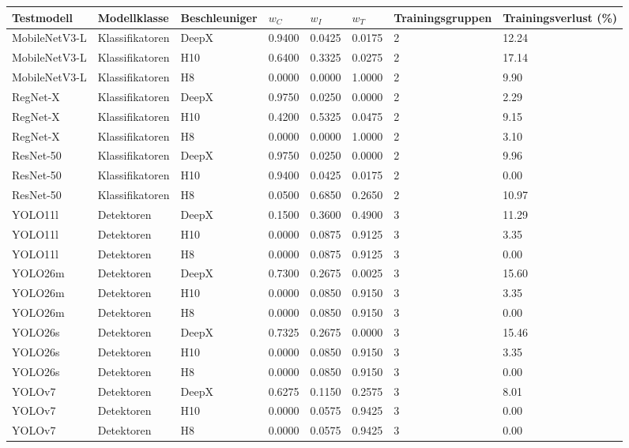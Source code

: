 \begin{tabular}{@{}llllllll@{}}
\toprule
Testmodell & Modellklasse & Beschleuniger & $w_C$ & $w_I$ & $w_T$ & Trainingsgruppen & Trainingsverlust (\%) \\
\midrule
MobileNetV3-L & Klassifikatoren & DeepX & 0.9400 & 0.0425 & 0.0175 & 2 & 12.24 \\
MobileNetV3-L & Klassifikatoren & H10 & 0.6400 & 0.3325 & 0.0275 & 2 & 17.14 \\
MobileNetV3-L & Klassifikatoren & H8 & 0.0000 & 0.0000 & 1.0000 & 2 & 9.90 \\
RegNet-X & Klassifikatoren & DeepX & 0.9750 & 0.0250 & 0.0000 & 2 & 2.29 \\
RegNet-X & Klassifikatoren & H10 & 0.4200 & 0.5325 & 0.0475 & 2 & 9.15 \\
RegNet-X & Klassifikatoren & H8 & 0.0000 & 0.0000 & 1.0000 & 2 & 3.10 \\
ResNet-50 & Klassifikatoren & DeepX & 0.9750 & 0.0250 & 0.0000 & 2 & 9.96 \\
ResNet-50 & Klassifikatoren & H10 & 0.9400 & 0.0425 & 0.0175 & 2 & 0.00 \\
ResNet-50 & Klassifikatoren & H8 & 0.0500 & 0.6850 & 0.2650 & 2 & 10.97 \\
YOLO11l & Detektoren & DeepX & 0.1500 & 0.3600 & 0.4900 & 3 & 11.29 \\
YOLO11l & Detektoren & H10 & 0.0000 & 0.0875 & 0.9125 & 3 & 3.35 \\
YOLO11l & Detektoren & H8 & 0.0000 & 0.0875 & 0.9125 & 3 & 0.00 \\
YOLO26m & Detektoren & DeepX & 0.7300 & 0.2675 & 0.0025 & 3 & 15.60 \\
YOLO26m & Detektoren & H10 & 0.0000 & 0.0850 & 0.9150 & 3 & 3.35 \\
YOLO26m & Detektoren & H8 & 0.0000 & 0.0850 & 0.9150 & 3 & 0.00 \\
YOLO26s & Detektoren & DeepX & 0.7325 & 0.2675 & 0.0000 & 3 & 15.46 \\
YOLO26s & Detektoren & H10 & 0.0000 & 0.0850 & 0.9150 & 3 & 3.35 \\
YOLO26s & Detektoren & H8 & 0.0000 & 0.0850 & 0.9150 & 3 & 0.00 \\
YOLOv7 & Detektoren & DeepX & 0.6275 & 0.1150 & 0.2575 & 3 & 8.01 \\
YOLOv7 & Detektoren & H10 & 0.0000 & 0.0575 & 0.9425 & 3 & 0.00 \\
YOLOv7 & Detektoren & H8 & 0.0000 & 0.0575 & 0.9425 & 3 & 0.00 \\
\bottomrule
\end{tabular}
